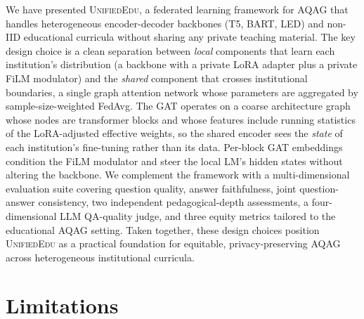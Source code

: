 \documentclass[11pt]{article}
\theoremstyle{plain}
\theoremstyle{definition}
\theoremstyle{remark}
\newcommand{\UniEdu}{\textsc{UnifiedEdu}}
\begin{document}
We have presented \UniEdu{}, a federated learning
framework for AQAG that handles heterogeneous
encoder-decoder backbones (T5, BART, LED) and
non-IID educational curricula without sharing any
private teaching material. The key design choice is a
clean separation between \emph{local} components that
learn each institution's distribution (a backbone
with a private LoRA adapter plus a private FiLM
modulator) and the \emph{shared} component that
crosses institutional boundaries, a single graph
attention network whose parameters are aggregated by
sample-size-weighted FedAvg. The GAT operates on a
coarse architecture graph whose nodes are transformer
blocks and whose features include running statistics
of the LoRA-adjusted effective weights, so the shared
encoder sees the \emph{state} of each institution's
fine-tuning rather than its data. Per-block GAT
embeddings condition the FiLM modulator and steer the
local LM's hidden states without altering the
backbone. We complement the framework with a
multi-dimensional evaluation suite covering question
quality, answer faithfulness, joint question-answer
consistency, two independent pedagogical-depth
assessments, a four-dimensional LLM QA-quality
judge, and three equity metrics tailored to the
educational AQAG setting. Taken together, these design choices position
\UniEdu{} as a practical foundation for equitable,
privacy-preserving AQAG across heterogeneous
institutional curricula.

\section*{Limitations}
\label{sec:limitations}
\end{document}
